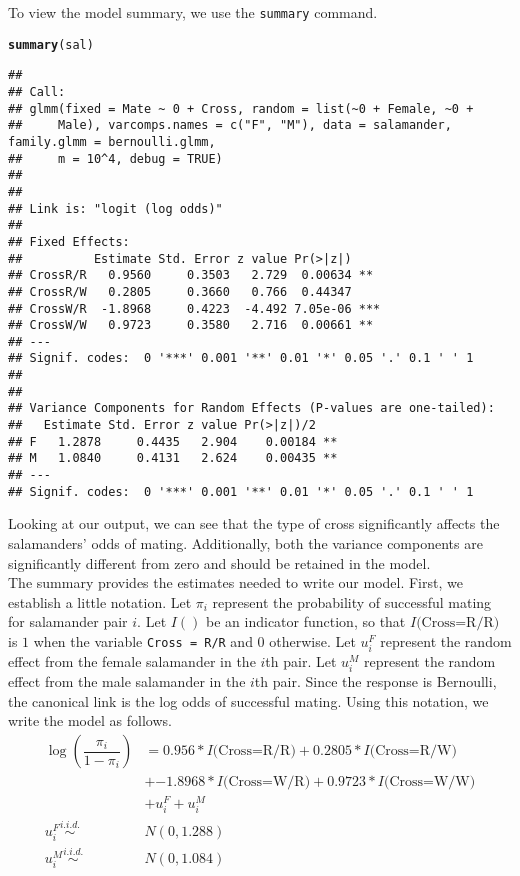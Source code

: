 \documentclass[11pt]{article}\usepackage[]{graphicx}\usepackage[]{color}
\makeatletter
\newcommand{\hlstd}[1]{\textcolor[rgb]{0.345,0.345,0.345}{#1}}%
\newcommand{\hlkwd}[1]{\textcolor[rgb]{0.737,0.353,0.396}{\textbf{#1}}}%
\newenvironment{kframe}{%
 \def\at@end@of@kframe{}%
 \ifinner\ifhmode%
  \def\at@end@of@kframe{\end{minipage}}%
  \begin{minipage}{\columnwidth}%
 \fi\fi%
 \def\FrameCommand##1{\hskip\@totalleftmargin \hskip-\fboxsep
 \colorbox{shadecolor}{##1}\hskip-\fboxsep
     \hskip-\linewidth \hskip-\@totalleftmargin \hskip\columnwidth}%
 \MakeFramed {\advance\hsize-\width
   \@totalleftmargin\z@ \linewidth\hsize
   \@setminipage}}%
 {\par\unskip\endMakeFramed%
 \at@end@of@kframe}
\newenvironment{knitrout}{}{} %
\makeatother
\begin{document}
To view the model summary, we use the \texttt{summary} command.
\begin{knitrout}
\color{fgcolor}\begin{kframe}
\begin{alltt}
\hlkwd{summary}\hlstd{(sal)}
\end{alltt}
\begin{verbatim}
## 
## Call:
## glmm(fixed = Mate ~ 0 + Cross, random = list(~0 + Female, ~0 + 
##     Male), varcomps.names = c("F", "M"), data = salamander, family.glmm = bernoulli.glmm, 
##     m = 10^4, debug = TRUE)
## 
## 
## Link is: "logit (log odds)"
## 
## Fixed Effects:
##          Estimate Std. Error z value Pr(>|z|)    
## CrossR/R   0.9560     0.3503   2.729  0.00634 ** 
## CrossR/W   0.2805     0.3660   0.766  0.44347    
## CrossW/R  -1.8968     0.4223  -4.492 7.05e-06 ***
## CrossW/W   0.9723     0.3580   2.716  0.00661 ** 
## ---
## Signif. codes:  0 '***' 0.001 '**' 0.01 '*' 0.05 '.' 0.1 ' ' 1
## 
## 
## Variance Components for Random Effects (P-values are one-tailed):
##   Estimate Std. Error z value Pr(>|z|)/2   
## F   1.2878     0.4435   2.904    0.00184 **
## M   1.0840     0.4131   2.624    0.00435 **
## ---
## Signif. codes:  0 '***' 0.001 '**' 0.01 '*' 0.05 '.' 0.1 ' ' 1
\end{verbatim}
\end{kframe}
\end{knitrout}

Looking at our output, we can see that the type of cross significantly affects the salamanders' odds of mating. Additionally, both the variance components are significantly different from zero and should be retained in the model.\\

The summary provides the estimates needed to write our model. First, we establish a little notation. Let $\pi_i$ represent the probability of successful mating for salamander pair $i$. Let $I()$ be an indicator function, so that $I\text{(Cross=R/R)}$ is $1$ when the variable \texttt{Cross = R/R} and 0 otherwise. Let $u_i^F$ represent the random effect from the female salamander in the $i$th pair. Let $u_i^M$ represent the random effect from the male salamander in the $i$th pair. Since the response is Bernoulli, the canonical link is the log odds of successful mating. Using this notation, we write the model as follows.\\
\begin{align*}
\log \left( \dfrac{\pi_i}{1-\pi_i} \right) &= 0.956 * I\text{(Cross=R/R)} + 0.2805 * I\text{(Cross=R/W)}\\
 &+ \ensuremath{-1.8968} * I\text{(Cross=W/R)}
+ 0.9723 * I\text{(Cross=W/W)}\\
 &+ u_i^F+u_i^M\\
u_i^F \overset{i.i.d.}{\sim} &N(0,1.288)\\
u_i^M \overset{i.i.d.}{\sim} &N(0,1.084)\\
\end{align*}
\end{document}
